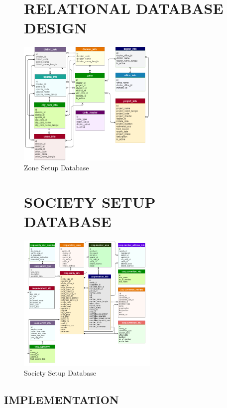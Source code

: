 \begin{figure}[h]
\section{RELATIONAL DATABASE DESIGN}
  \centering
  \includegraphics[width=0.6\textwidth]{Chap3/6.png}
  \caption{Zone Setup Database}
  \label{fig:example}
\end{figure}

\begin{figure}[h]
\section{SOCIETY SETUP DATABASE}
  \centering
  \includegraphics[width=0.6\textwidth]{Chap3/7.png}
  \caption{Society Setup Database}
  \label{fig:example}
\end{figure}



\subsection{IMPLEMENTATION}

